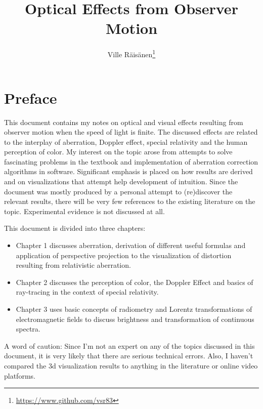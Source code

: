 \documentclass [12pt, a4paper] {article}
\title{Optical Effects from Observer Motion}
\author{Ville R{\"a}is{\"a}nen\thanks{\url{https://www.github.com/vsr83}}}
\begin{document}
\maketitle
\section*{Preface}
This document contains my notes on optical and visual effects resulting from 
observer motion when the speed of light is finite. The discussed effects are 
related to the interplay of aberration, Doppler effect, special relativity
and the human perception of color. My interest on the topic arose from 
attempts to solve fascinating problems in the textbook \cite{relativity_problems}
and implementation of aberration correction algorithms in software.
Significant emphasis is placed on how results are derived and on visualizations 
that attempt help development of intuition. Since the document was mostly produced 
by a personal attempt to (re)discover the relevant results, there will be very 
few references to the existing literature on the topic. Experimental evidence 
is not discussed at all. 

This document is divided into three chapters:
\begin {itemize}
\item Chapter 1 discusses aberration, derivation of different useful formulas 
and application of perspective projection to the visualization of distortion 
resulting from relativistic aberration.
\item Chapter 2 discusses the perception of color, the Doppler Effect and 
basics of ray-tracing in the context of special relativity.
\item Chapter 3 uses basic concepts of radiometry and Lorentz transformations of 
electromagnetic fields to discuss brightness and transformation of 
continuous spectra. 
\end {itemize}
A word of caution: Since I'm not an expert on any of the topics discussed in 
this document, it is very likely that there are serious technical errors. 
Also, I haven't compared the 3d visualization results to anything in
the literature or online video platforms.

\newpage

\tableofcontents

\newpage
\end{document}
